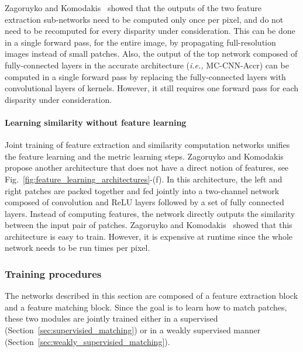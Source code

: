 \documentclass[10pt,journal,compsoc]{IEEEtran}
\newcommand{\ie}{\emph{i.e., }}
\begin{document}
Zagoruyko and Komodakis~\cite{zagoruyko2015learning}  showed that the  outputs of the two feature extraction sub-networks need to be computed only once per pixel, and do not need to be recomputed for every disparity under consideration. This can be done in a single forward pass, for the entire image,  by propagating full-resolution images instead of small patches. Also, the output of the top network composed of fully-connected layers in the accurate architecture (\ie MC-CNN-Accr) can be computed in a single forward pass by replacing the fully-connected layers with convolutional layers of  kernels. However, it still requires one forward pass for each disparity under consideration. 

\paragraph{Learning similarity without  feature learning}
Joint training  of feature extraction  and similarity computation networks unifies the feature learning and the metric learning steps. Zagoruyko and Komodakis~\cite{zagoruyko2015learning} propose another architecture that does not have a direct notion of features, see Fig.~\ref{fig:feature_learning_architectures}-(f). In this architecture, the left and right patches are packed together and fed jointly into a two-channel network composed of convolution and ReLU layers followed by a set of fully connected layers. Instead of computing features, the network directly outputs the similarity between the input pair of patches. Zagoruyko and Komodakis~\cite{zagoruyko2015learning} showed that this architecture is easy to train. However, it is expensive at runtime since the whole network needs to be  run  times per pixel.


\subsubsection{Training procedures}

The networks described in this section are composed of a feature extraction block and a feature matching block. Since the goal is to learn how to match patches, these two modules are jointly trained either in a supervised  (Section~\ref{sec:supervisied_matching}) or in a weakly supervised manner (Section~\ref{sec:weakly_supervisied_matching}).
\end{document}
